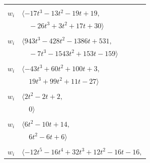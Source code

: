 \documentclass[11pt]{article}
\begin{document}
\begin{longtable}{@{}ll@{}}
\addlinespace[2pt]
\multicolumn{2}{@{}p{0.97\textwidth}@{}}{$i=29$, $D_i=4$, $\rho_{ij}$: $1{:}1, \allowbreak 3{:}2, \allowbreak 11{:}2, \allowbreak 18{:}2, \allowbreak 19{:}1, \allowbreak 20{:}2, \allowbreak 23{:}1, \allowbreak 28{:}1, \allowbreak 38{:}2, \allowbreak 42{:}1, \allowbreak 44{:}1$}\\
$w_i$ & $\langle -17t^{3}-13t^{2}-19t+19,$\\
 & $\quad -26t^{3}+3t^{2}+17t+30\rangle$\\
\addlinespace[2pt]
\multicolumn{2}{@{}p{0.97\textwidth}@{}}{$i=30$, $D_i=16$, $\rho_{ij}$: $0{:}2, \allowbreak 4{:}2, \allowbreak 6{:}2, \allowbreak 13{:}1, \allowbreak 16{:}1, \allowbreak 19{:}1, \allowbreak 23{:}1, \allowbreak 34{:}2, \allowbreak 36{:}2, \allowbreak 41{:}1, \allowbreak 44{:}1, \allowbreak 45{:}1, \allowbreak 48{:}1$}\\
$w_i$ & $\langle 943t^{3}-428t^{2}-1386t+531,$\\
 & $\quad -7t^{3}-1543t^{2}+153t-159\rangle$\\
\addlinespace[2pt]
\multicolumn{2}{@{}p{0.97\textwidth}@{}}{$i=31$, $D_i=4$, $\rho_{ij}$: $2{:}2, \allowbreak 5{:}2, \allowbreak 16{:}2, \allowbreak 26{:}1, \allowbreak 38{:}1, \allowbreak 39{:}2, \allowbreak 42{:}1, \allowbreak 48{:}1$}\\
$w_i$ & $\langle -43t^{3}+60t^{2}+100t+3,$\\
 & $\quad 19t^{3}+99t^{2}+11t-27\rangle$\\
\addlinespace[2pt]
\multicolumn{2}{@{}p{0.97\textwidth}@{}}{$i=32$, $D_i=2$, $\rho_{ij}$: $13{:}2, \allowbreak 15{:}2, \allowbreak 17{:}1, \allowbreak 27{:}2$}\\
$w_i$ & $\langle 2t^{2}-2t+2,$\\
 & $\quad 0\rangle$\\
\addlinespace[2pt]
\multicolumn{2}{@{}p{0.97\textwidth}@{}}{$i=33$, $D_i=2$, $\rho_{ij}$: $8{:}1, \allowbreak 9{:}2, \allowbreak 24{:}1, \allowbreak 35{:}2, \allowbreak 42{:}2$}\\
$w_i$ & $\langle 6t^{2}-10t+14,$\\
 & $\quad 6t^{2}-6t+6\rangle$\\
\addlinespace[2pt]
\multicolumn{2}{@{}p{0.97\textwidth}@{}}{$i=34$, $D_i=2$, $\rho_{ij}$: $1{:}1, \allowbreak 2{:}2, \allowbreak 12{:}1, \allowbreak 14{:}1, \allowbreak 19{:}2, \allowbreak 25{:}1, \allowbreak 26{:}2, \allowbreak 30{:}1, \allowbreak 37{:}1, \allowbreak 40{:}1, \allowbreak 41{:}2, \allowbreak 42{:}2$}\\
$w_i$ & $\langle -12t^{5}-16t^{4}+32t^{3}+12t^{2}-16t-16,$\\

\end{longtable}
\end{document}
